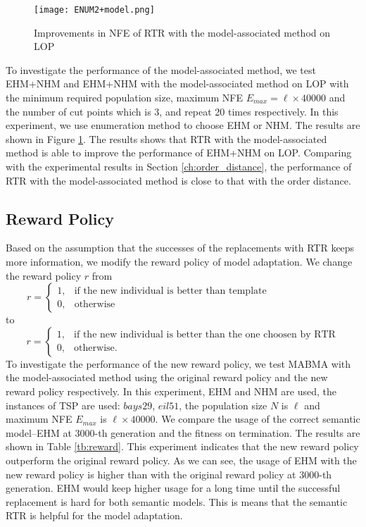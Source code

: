 \begin{figure}[htbp] 
        \centering
        \texttt{[image: ENUM2+model.png]}
        \caption{ Improvements in NFE of RTR with the model-associated method on LOP } 
        \label{fig:enum2_model}
\end{figure}

To investigate the performance of the model-associated method, we test EHM+NHM and EHM+NHM with the model-associated method on LOP with the minimum required population size, maximum NFE $E_{max} = \ell\times 40000$ and the number of cut points which is 3, and repeat 20 times respectively. In this experiment, we use enumeration method to choose EHM or NHM. The results are shown in Figure \ref{fig:enum2_model}. The results shows that RTR with the model-associated method is able to improve the performance of EHM+NHM on LOP. Comparing with the experimental results in Section \ref{ch:order_distance}, the performance of RTR with the model-associated method is close to that with the order distance. 

\subsection{Reward Policy}

Based on the assumption that the successes of the replacements with RTR keeps more information, we modify the reward policy of model adaptation. We change the reward policy $r$ from \[r=
\begin{cases}
1,  & \mbox{if the new individual is better than template~~~~~~~~~~~~~~~~~~~~ }\\
0, & \mbox{otherwise}
\end{cases}
\]to\[r=
\begin{cases}
1,  & \mbox{if the new individual is better than the one choosen by RTR}\\
0, & \mbox{otherwise.}
\end{cases}
\]
To investigate the performance of the new reward policy, we test MABMA with the model-associated method using the original reward policy and the new reward policy respectively. In this experiment, EHM and NHM are used, the instances of TSP are used: $bays29$, $eil51$, the population size $N$ is $\ell$ and maximum NFE $E_{max}$ is $\ell\times 40000$. We compare the usage of the correct semantic model--EHM at $3000$-th generation and the fitness on termination.  The results are shown in Table \ref{tb:reward}.  This experiment indicates that the new reward policy outperform the original reward policy.  As we can see, the usage of EHM with the new reward policy is higher than with the original reward policy at $3000$-th generation. EHM would keep higher usage for a long time until the successful replacement is hard for both semantic models. This is means that the semantic RTR is helpful for the model adaptation.


